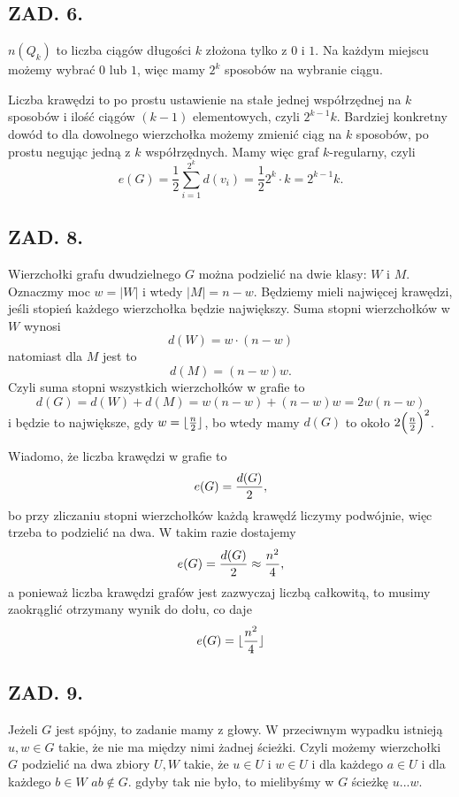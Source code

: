 \documentclass{article}
\begin{document}
    \subsection*{ZAD. 6.}

    $n(Q_k)$ to liczba ciągów długości $k$ złożona tylko z $0$ i $1$. Na każdym miejscu możemy wybrać $0$ lub $1$, więc mamy $2^k$ sposobów na wybranie ciągu.

    Liczba krawędzi to po prostu ustawienie na stałe jednej współrzędnej na $k$ sposobów i ilość ciągów $(k-1)$ elementowych, czyli $2^{k-1}k$. Bardziej konkretny dowód to dla dowolnego wierzchołka możemy zmienić ciąg na $k$ sposobów, po prostu negując jedną z $k$ współrzędnych. Mamy więc graf $k$-regularny, czyli 
    $$e(G)=\frac12\sum\limits_{i=1}^{2^k} d(v_i)=\frac122^k\cdot k=2^{k-1}k.$$

    \subsection*{ZAD. 8.}

    Wierzchołki grafu dwudzielnego $G$ można podzielić na dwie klasy: $W$ i $M$. Oznaczmy moc $w=|W|$ i wtedy $|M|=n-w$. Będziemy mieli najwięcej krawędzi, jeśli stopień każdego wierzchołka będzie największy. Suma stopni wierzchołków w $W$ wynosi
    $$d(W)=w\cdot(n-w)$$
    natomiast dla $M$ jest to
    $$d(M)=(n-w)w.$$
    Czyli suma stopni wszystkich wierzchołków w grafie to
    $$d(G)=d(W)+d(M)=w(n-w)+(n-w)w=2w(n-w)$$
    i będzie to największe, gdy $w=\lfloor {n\over2}\rfloor$, bo wtedy mamy $d(G)$ to około $2\Big({n\over2}\Big)^2$.

    Wiadomo, że liczba krawędzi w grafie to
    $$e(G)={d(G)\over2},$$
    bo przy zliczaniu stopni wierzchołków każdą krawędź liczymy podwójnie, więc trzeba to podzielić na dwa. W takim razie dostajemy
    $$e(G)={d(G)\over 2}\approx{n^2\over4},$$
    a ponieważ liczba krawędzi grafów jest zazwyczaj liczbą całkowitą, to musimy zaokrąglić otrzymany wynik do dołu, co daje
    $$e(G)=\lfloor{n^2\over4}\rfloor$$
    
    \subsection*{ZAD. 9.}

    Jeżeli $G$ jest spójny, to zadanie mamy z głowy. W przeciwnym wypadku istnieją $u,w\in G$ takie, że nie ma między nimi żadnej ścieżki. Czyli możemy wierzchołki $G$ podzielić na dwa zbiory $U,W$ takie, że $u\in U$ i $w\in U$ i dla każdego $a\in U$ i dla każdego $b\in W$ $ab\notin G$. gdyby tak nie było, to mielibyśmy w $G$ ścieżkę $u...w$.
    
\end{document}
